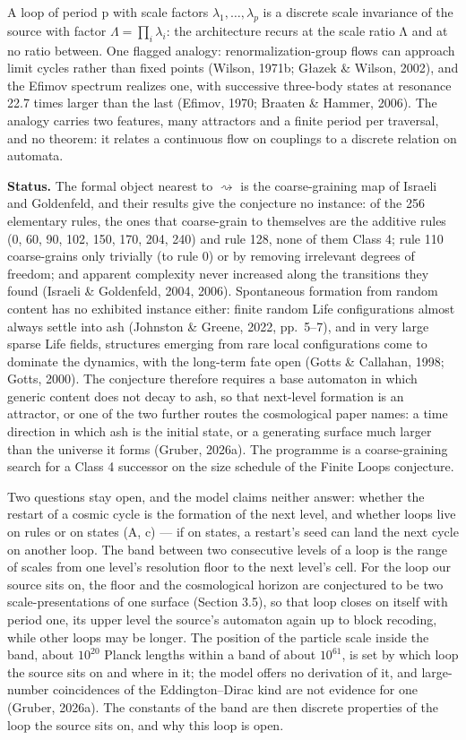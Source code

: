 \documentclass[
]{article}
\begin{document}
A loop of period p with scale factors \(\lambda_1, \dots, \lambda_p\) is
a discrete scale invariance of the source with factor
\(\Lambda = \prod_i \lambda_i\): the architecture recurs at the scale
ratio Λ and at no ratio between. One flagged analogy:
renormalization-group flows can approach limit cycles rather than fixed
points (Wilson, 1971b; Głazek \& Wilson, 2002), and the Efimov spectrum
realizes one, with successive three-body states at resonance 22.7 times
larger than the last (Efimov, 1970; Braaten \& Hammer, 2006). The
analogy carries two features, many attractors and a finite period per
traversal, and no theorem: it relates a continuous flow on couplings to
a discrete relation on automata.

\textbf{Status.} The formal object nearest to \(\rightsquigarrow\) is
the coarse-graining map of Israeli and Goldenfeld, and their results
give the conjecture no instance: of the 256 elementary rules, the ones
that coarse-grain to themselves are the additive rules (0, 60, 90, 102,
150, 170, 204, 240) and rule 128, none of them Class 4; rule 110
coarse-grains only trivially (to rule 0) or by removing irrelevant
degrees of freedom; and apparent complexity never increased along the
transitions they found (Israeli \& Goldenfeld, 2004, 2006). Spontaneous
formation from random content has no exhibited instance either: finite
random Life configurations almost always settle into ash (Johnston \&
Greene, 2022, pp.~5--7), and in very large sparse Life fields,
structures emerging from rare local configurations come to dominate the
dynamics, with the long-term fate open (Gotts \& Callahan, 1998; Gotts,
2000). The conjecture therefore requires a base automaton in which
generic content does not decay to ash, so that next-level formation is
an attractor, or one of the two further routes the cosmological paper
names: a time direction in which ash is the initial state, or a
generating surface much larger than the universe it forms (Gruber,
2026a). The programme is a coarse-graining search for a Class 4
successor on the size schedule of the Finite Loops conjecture.

Two questions stay open, and the model claims neither answer: whether
the restart of a cosmic cycle is the formation of the next level, and
whether loops live on rules or on states (A, c) --- if on states, a
restart's seed can land the next cycle on another loop. The band between
two consecutive levels of a loop is the range of scales from one level's
resolution floor to the next level's cell. For the loop our source sits
on, the floor and the cosmological horizon are conjectured to be two
scale-presentations of one surface (Section 3.5), so that loop closes on
itself with period one, its upper level the source's automaton again up
to block recoding, while other loops may be longer. The position of the
particle scale inside the band, about \(10^{20}\) Planck lengths within
a band of about \(10^{61}\), is set by which loop the source sits on and
where in it; the model offers no derivation of it, and large-number
coincidences of the Eddington--Dirac kind are not evidence for one
(Gruber, 2026a). The constants of the band are then discrete properties
of the loop the source sits on, and why this loop is open.
\end{document}
